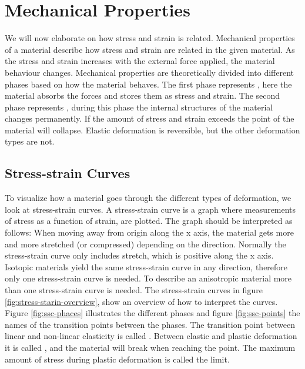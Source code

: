\section{Mechanical Properties}
\label{mechanical-properties}
We will now elaborate on how stress and strain is related. Mechanical
properties of a material describe how stress and 
strain are related in the given material.
%
As the stress and strain increases with the external force applied,
the material behaviour changes.
Mechanical properties are theoretically divided into different
phases based on how the material behaves. The first phase represents  
, here the material absorbs the forces and
stores them as stress and strain. The second phase represents
, during this phase the internal structures
of the material changes permanently. If the amount of stress and
strain exceeds the point of  the material will collapse.
Elastic deformation is reversible, but the other deformation types are not.



\subsection{Stress-strain Curves}
\label{sec:sscs}
To visualize how a material goes through the different
types of deformation, we look at stress-strain curves. A stress-strain
curve is a graph where measurements of stress as a function of
strain, are plotted. The graph should be interpreted as follows: When
moving away from origin along the x axis, the material gets more and
more stretched (or compressed) depending on the direction. Normally
the stress-strain curve only includes stretch, which is positive along
the x axis.
%
Isotopic materials yield the same stress-strain curve in
any direction, therefore only one stress-strain curve is needed. To
describe an anisotropic material more than one stress-strain curve is
needed.
%
The stress-strain curves in figure \vref{fig:stress-starin-overview},
show an overview of how to interpret the curves. Figure
\ref{fig:ssc-phaces} illustrates the different phases and figure
\ref{fig:ssc-points} the names of the transition points between the
phases. The transition point between linear and non-linear elasticity
is called . Between elastic and
plastic deformation it is called , and the
material will break when reaching the  point.
The maximum amount of stress during plastic deformation is called the
 limit.

